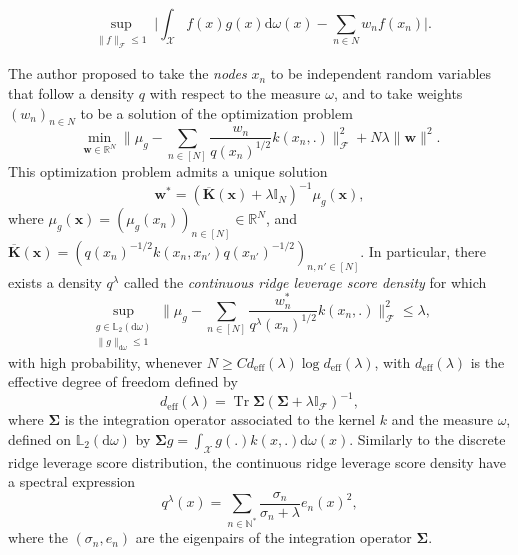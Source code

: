 \documentclass[twoside,11pt]{book}
\numberwithin{theorem}{chapter}
\numberwithin{definition}{chapter}
\numberwithin{proposition}{chapter}
\numberwithin{corollary}{chapter}
\numberwithin{example}{chapter}
\numberwithin{lemma}{chapter}
\numberwithin{assumption}{chapter}
\numberwithin{equation}{chapter}
\numberwithin{figure}{chapter}
\DeclareMathOperator{\Tr}{Tr}
\DeclareMathOperator{\eff}{\mathrm{eff}}
\DeclareMathOperator{\F}{\mathcal{F}}
\DeclareMathOperator{\X}{\mathcal{X}}
\begin{document}
\begin{equation}
\sup\limits_{\substack{\|f\|_{\F} \leq 1}} \Big| \int_{\X} f(x)g(x)\mathrm{d}\omega(x) - \sum_{n \in N}w_{n}f(x_{n}) \Big|.
\end{equation}



The author proposed to take the \emph{nodes} $x_{n}$ to be independent random variables that follow a density $q$ with respect to the measure $\omega$, and to take weights $(w_{n})_{n \in N}$ to be a solution of the optimization problem
\begin{equation}\label{eq:introduction_reg_problem_kernel_quadrature}
\min\limits_{ \bm{w}\in \mathbb{R}^{N}} \Big\|\mu_{g} - \sum\limits_{n \in [N]} \frac{w_{n}}{q(x_{n})^{1/2}}k(x_{n},.) \Big\|_{\F}^{2} + N \lambda \|\bm{w}\|^{2}.
\end{equation}
This optimization problem admits a unique solution 
\begin{equation}
\bm{w}^{*} = (\overline{\bm{K}}(\bm{x})+\lambda \mathbb{I}_{N})^{-1}\mu_{g}(\bm{x}),
\end{equation}
where $\mu_{g}(\bm{x}) = (\mu_{g}(x_{n}))_{n \in [N]} \in \mathbb{R}^{N}$, and $\overline{\bm{K}}(\bm{x}) = (q(x_{n})^{-1/2} k(x_{n},x_{n'}) q(x_{n'})^{-1/2})_{n,n' \in [N]}$. 
In particular, there exists a density $q^{\lambda}$ called the \emph{continuous ridge leverage score density} for which 
\begin{equation}
\sup\limits_{\substack{g \in \mathbb{L}_2(\mathrm{d}\omega)\\ \|g\|_{\mathrm{d}\omega} \leq 1}} \Big \|\mu_g - \sum\limits_{n \in [N]} \frac{w_{n}^{*}}{q^{\lambda}(x_{n})^{1/2}}k(x_{n},.) \Big \|_{\F}^{2} \leq \lambda, 
\end{equation}
with high probability, whenever $N \geq C d_{\eff}(\lambda) \log d_{\eff}(\lambda)$, with $d_{\eff}(\lambda)$ is the effective degree of freedom defined by
\begin{equation}
d_{\eff}(\lambda) = \Tr \bm{\Sigma}(\bm{\Sigma} + \lambda \mathbb{I}_{\F})^{-1},
\end{equation}
where $\bm{\Sigma}$ is the integration operator associated to the kernel $k$ and the measure $\omega$, defined on $\mathbb{L}_{2}(\mathrm{d}\omega)$ by $\bm{\Sigma} g = \int_{\X} g(.)k(x,.) \mathrm{d}\omega(x)$. Similarly to the discrete ridge leverage score distribution, the continuous ridge leverage score density have a spectral expression
\begin{equation}
q^{\lambda}(x) = \sum\limits_{n \in \mathbb{N}^{*}} \frac{\sigma_{n}}{\sigma_n + \lambda} e_{n}(x)^{2},
\end{equation} 
where the $(\sigma_{n},e_n)$ are the eigenpairs of the integration operator $\bm{\Sigma}$. 
\end{document}
